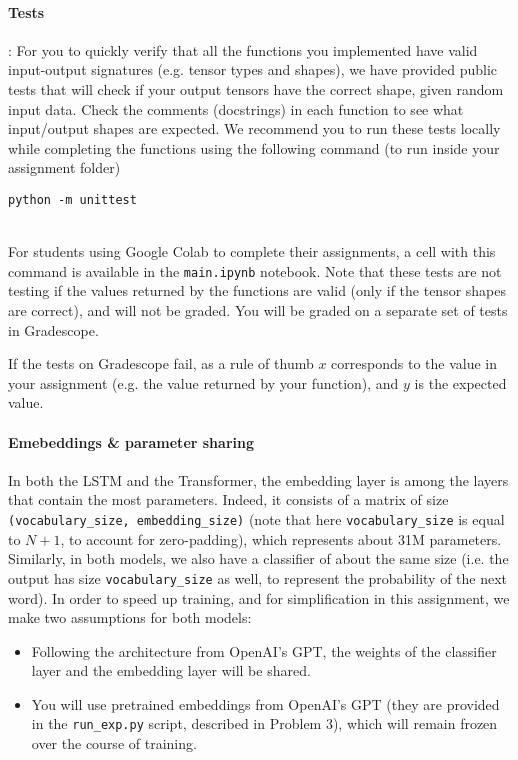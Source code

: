 \documentclass[12pt]{article}
\begin{document}
\paragraph{Tests}: For you to quickly verify that all the functions you implemented have  valid input-output signatures (e.g. tensor types and shapes), we have provided public tests that will check if your output tensors have the correct shape, given random input data. Check the comments (docstrings) in each function to see what input/output shapes are expected. We recommend you to run these tests locally while completing the functions using the following command (to run inside your assignment folder)\\[0.5em]
\begin{minipage}{\linewidth}
\centering
\texttt{python -m unittest}
\end{minipage}\\[0.5em]
For students using Google Colab to complete their assignments, a cell with this command is available in the \texttt{main.ipynb} notebook. Note that these tests are not testing if the values returned by the functions are valid (only if the tensor shapes are correct), and will not be graded. You will be graded on a separate set of tests in Gradescope.

\noindent If the tests on Gradescope fail, as a rule of thumb $x$ corresponds to the value in your assignment (e.g. the value returned by your function), and $y$ is the expected value.

\paragraph{Emebeddings \& parameter sharing} In both the LSTM and the Transformer, the embedding layer is among the layers that contain the most parameters. Indeed, it consists of a matrix of size \texttt{(vocabulary\_size, embedding\_size)} (note that here \texttt{vocabulary\_size} is equal to $N + 1$, to account for zero-padding), which represents about 31M parameters. Similarly, in both models, we also have a classifier of about the same size (i.e. the output has size \texttt{vocabulary\_size} as well, to represent the probability of the next word). In order to speed up training, and for simplification in this assignment, we make two assumptions for both models:
\begin{itemize}
    \item Following the architecture from OpenAI's GPT, the weights of the classifier layer and the embedding layer will be shared.
    \item You will use pretrained embeddings from OpenAI's GPT (they are provided in the \texttt{run\_exp.py} script, described in Problem 3), which will remain frozen over the course of training.
\end{itemize}
\end{document}
